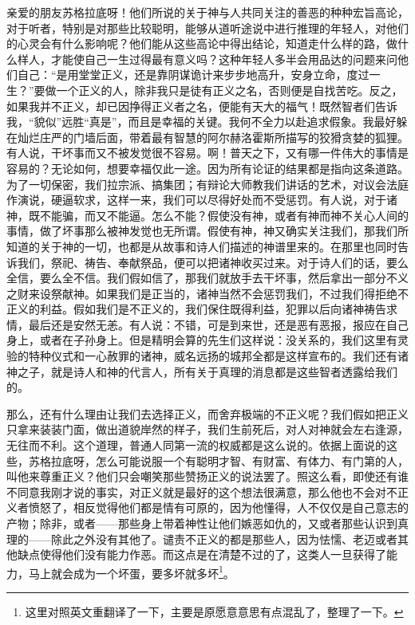 \documentclass[11pt,oneside]{book}
\begin{document}
\begin{common-format}
亲爱的朋友苏格拉底呀！他们所说的关于神与人共同关注的善恶的种种宏旨高论，对于听者，特别是对那些比较聪明，能够从道听途说中进行推理的年轻人，对他们的心灵会有什么影响呢？他们能从这些高论中得出结论，知道走什么样的路，做什么样人，才能使自己一生过得最有意义吗？这种年轻人多半会用品达的问题来问他们自己：“是用堂堂正义，还是靠阴谋诡计来步步地高升，安身立命，度过一生？”要做一个正义的人，除非我只是徒有正义之名，否则便是自找苦吃。反之，如果我并不正义，却已因挣得正义者之名，便能有天大的福气！既然智者们告诉我，“貌似”远胜“真是”，而且是幸福的关键。我何不全力以赴追求假象。我最好躲在灿烂庄严的门墙后面，带着最有智慧的阿尔赫洛霍斯所描写的狡猾贪婪的狐狸。有人说，干坏事而又不被发觉很不容易。啊！普天之下，又有哪一件伟大的事情是容易的？无论如何，想要幸福仅此一途。因为所有论证的结果都是指向这条道路。为了一切保密，我们拉宗派、搞集团；有辩论大师教我们讲话的艺术，对议会法庭作演说，硬逼软求，这样一来，我们可以尽得好处而不受惩罚。有人说，对于诸神，既不能骗，而又不能逼。怎么不能？假使没有神，或者有神而神不关心人间的事情，做了坏事那么被神发觉也无所谓。假使有神，神又确实关注我们，那我们所知道的关于神的一切，也都是从故事和诗人们描述的神谱里来的。在那里也同时告诉我们，祭祀、祷告、奉献祭品，便可以把诸神收买过来。对于诗人们的话，要么全信，要么全不信。我们假如信了，那我们就放手去干坏事，然后拿出一部分不义之财来设祭献神。如果我们是正当的，诸神当然不会惩罚我们，不过我们得拒绝不正义的利益。假如我们是不正义的，我们保住既得利益，犯罪以后向诸神祷告求情，最后还是安然无恙。有人说：不错，可是到来世，还是恶有恶报，报应在自己身上，或者在子孙身上。但是精明会算的先生们这样说：没关系的，我们这里有灵验的特种仪式和一心赦罪的诸神，威名远扬的城邦全都是这样宣布的。我们还有诸神之子，就是诗人和神的代言人，所有关于真理的消息都是这些智者透露给我们的。

那么，还有什么理由让我们去选择正义，而舍弃极端的不正义呢？我们假如把正义只拿来装装门面，做出道貌岸然的样子，我们生前死后，对人对神就会左右逢源，无往而不利。这个道理，普通人同第一流的权威都是这么说的。依据上面说的这些，苏格拉底呀，怎么可能说服一个有聪明才智、有财富、有体力、有门第的人，叫他来尊重正义？他们只会嘲笑那些赞扬正义的说法罢了。照这么看，即使还有谁不同意我刚才说的事实，对正义就是最好的这个想法很满意，那么他也不会对不正义者愤怒了，相反觉得他们都是情有可原的，因为他懂得，人不仅仅是自己意志的产物；除非，或者——那些身上带着神性让他们嫉恶如仇的，又或者那些认识到真理的——除此之外没有其他了。谴责不正义的都是那些人，因为怯懦、老迈或者其他缺点使得他们没有能力作恶。而这点是在清楚不过的了，这类人一旦获得了能力，马上就会成为一个坏蛋，要多坏就多坏\footnote{这里对照英文重翻译了一下，主要是原愿意意思有点混乱了，整理了一下。}。


\end{common-format}
\end{document}
